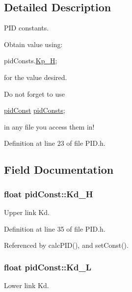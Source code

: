 \subsection{Detailed Description}
P\-I\-D constants. 

Obtain value using\-:
\begin{DoxyCode}
pidConsts.\hyperlink{structpid_const_ae2c7d62f4fd919c89233a39e1a84b2db}{Kp\_H}; 
\end{DoxyCode}
 for the value desired.

Do not forget to use
\begin{DoxyCode}
\hyperlink{structpid_const}{pidConst} \hyperlink{_p_i_d_8h_a4d2fc78b5924045bcc0e20fc95e18d97}{pidConsts}; 
\end{DoxyCode}
 in any file you access them in! 

Definition at line 23 of file P\-I\-D.\-h.



\subsection{Field Documentation}
\hypertarget{structpid_const_a239f5a849b57db2f52fe4e44aa979e2f}{
\subsubsection[{Kd\-\_\-\-H}]{\setlength{\rightskip}{0pt plus 5cm}float pid\-Const\-::\-Kd\-\_\-\-H}}\label{structpid_const_a239f5a849b57db2f52fe4e44aa979e2f}


Upper link Kd. 



Definition at line 35 of file P\-I\-D.\-h.



Referenced by calc\-P\-I\-D(), and set\-Const().

\hypertarget{structpid_const_ab1d5ff1148dc4f1b174757fe513bc368}{
\subsubsection[{Kd\-\_\-\-L}]{\setlength{\rightskip}{0pt plus 5cm}float pid\-Const\-::\-Kd\-\_\-\-L}}\label{structpid_const_ab1d5ff1148dc4f1b174757fe513bc368}


Lower link Kd. 



